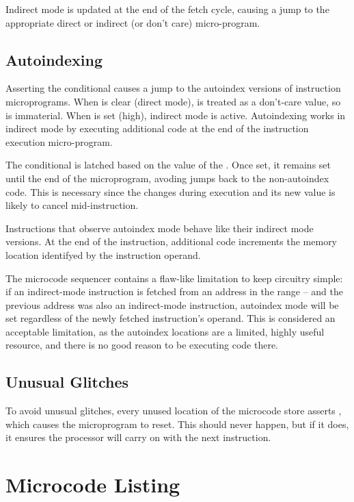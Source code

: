 Indirect mode is updated at the end of the fetch cycle, causing a jump
to the appropriate direct or indirect (or don't care) micro-program.

\subsection{Autoindexing}

Asserting the  conditional causes a jump to the autoindex
versions of instruction microprograms. When  is clear (direct
mode),  is treated as a don't-care value, so is
immaterial. When  is set (high), indirect mode is
active. Autoindexing works in indirect mode by executing additional
code at the end of the instruction execution micro-program.

The  conditional is latched based on the value of the
\AR{}. Once set, it remains set until the end of the microprogram,
avoding jumps back to the non-autoindex code. This is necessary since
the \AR{} changes during execution and its new value is likely to
cancel  mid-instruction.

Instructions that observe autoindex mode behave like their indirect
mode versions. At the end of the instruction, additional code
increments the memory location identifyed by the instruction operand.

The microcode sequencer contains a flaw-like limitation to keep
circuitry simple: if an indirect-mode instruction is fetched from an
address in the range – and the previous address
was also an indirect-mode instruction, autoindex mode will be set
regardless of the newly fetched instruction's operand. This is
considered an acceptable limitation, as the autoindex locations are a
limited, highly useful resource, and there is no good reason to be
executing code there.

\subsection{Unusual Glitches}

To avoid unusual glitches, every unused location of the microcode
store asserts , which causes the microprogram to reset. This
should never happen, but if it does, it ensures the processor will
carry on with the next instruction.

\section{Microcode Listing}


